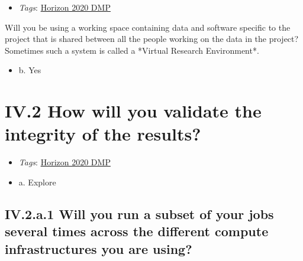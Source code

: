 \documentclass[a4paper,12pt]{report}
\begin{document}
\label{10a10ffd-bfe1-4c6b-bbb6-3dfb1e63a5d5.72099c46-16e7-47a2-a320-cc768b7085fe}


\begin{itemize}
  \item \textit{Tags}: \ul{Horizon 2020 DMP}
  \end{itemize}


\noindent
\begin{markdown}
Will you be using a working space containing data and software specific to the project that is shared between all the people working on the data in the project? Sometimes such a system is called a *Virtual Research Environment*.
\end{markdown}



\begin{itemize}
  \item[\CheckmarkBold] b. Yes
\end{itemize}






\section*{\protect\textcolor{colorSecId}{IV.2} How will you validate the integrity of the results?}

\label{10a10ffd-bfe1-4c6b-bbb6-3dfb1e63a5d5.918d5fd1-ea37-468f-8acd-ca3e80203900}


\begin{itemize}
  \item \textit{Tags}: \ul{Horizon 2020 DMP}
  \end{itemize}




\begin{itemize}
  \item[\CheckmarkBold] a. Explore
\end{itemize}




\subsection*{\protect\textcolor{colorSecId}{IV.2.a.1} Will you run a subset of your jobs several times across the different compute infrastructures you are using?}
\end{document}
